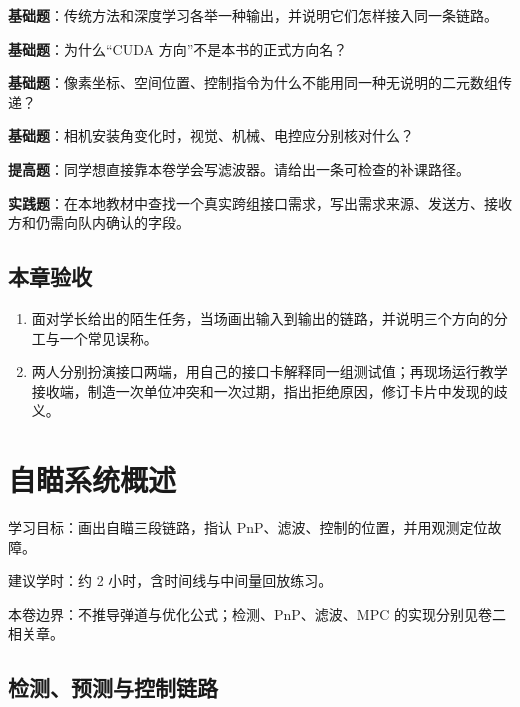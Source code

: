 \documentclass[
  lang=cn,
  scheme=chinese,
  chinesefont=ctexfont,
  11pt,
  oneside,
  device=normal,
  color=cyan,
  mode=fancy
]{elegantbook}
\begin{document}
\begin{problemset}
\item \label{v3-prob-overview-1}\textbf{基础题}：传统方法和深度学习各举一种输出，并说明它们怎样接入同一条链路。
\item \label{v3-prob-overview-2}\textbf{基础题}：为什么“CUDA 方向”不是本书的正式方向名？
\item \label{v3-prob-overview-3}\textbf{基础题}：像素坐标、空间位置、控制指令为什么不能用同一种无说明的二元数组传递？
\item \label{v3-prob-overview-4}\textbf{基础题}：相机安装角变化时，视觉、机械、电控应分别核对什么？
\item \label{v3-prob-overview-5}\textbf{提高题}：同学想直接靠本卷学会写滤波器。请给出一条可检查的补课路径。
\item \label{v3-prob-overview-6}\textbf{实践题}：在本地教材中查找一个真实跨组接口需求，写出需求来源、发送方、接收方和仍需向队内确认的字段。
\end{problemset}

\section{本章验收}
\begin{enumerate}
  \item 面对学长给出的陌生任务，当场画出输入到输出的链路，并说明三个方向的分工与一个常见误称。
  \item 两人分别扮演接口两端，用自己的接口卡解释同一组测试值；再现场运行教学接收端，制造一次单位冲突和一次过期，指出拒绝原因，修订卡片中发现的歧义。
\end{enumerate}

\chapter{自瞄系统概述}
\begin{introduction}
  \item 学习目标：画出自瞄三段链路，指认 PnP、滤波、控制的位置，并用观测定位故障。
  \item 建议学时：约 2 小时，含时间线与中间量回放练习。
  \item 本卷边界：不推导弹道与优化公式；检测、PnP、滤波、MPC 的实现分别见卷二相关章。
\end{introduction}
\label{ch:v3-aim}

\section{检测、预测与控制链路}

\end{document}
